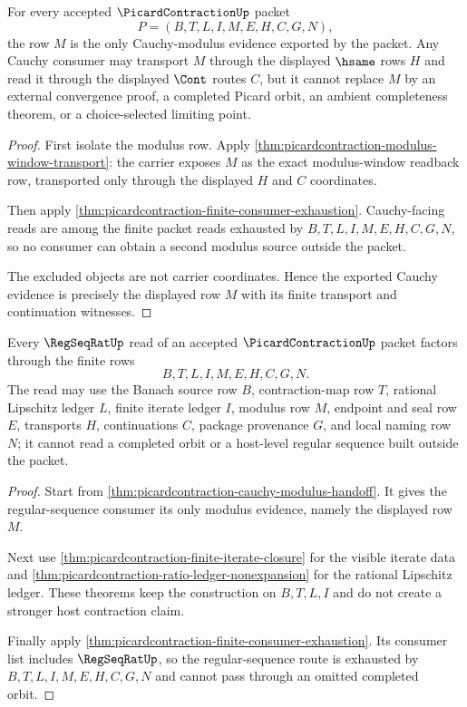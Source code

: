 \begin{theorem}
\label{thm:picardcontraction-cauchy-modulus-handoff}
For every accepted $\PicardContractionUp$ packet
$$
P=(B,T,L,I,M,E,H,C,G,N),
$$
the row $M$ is the only Cauchy-modulus evidence exported by the packet. Any Cauchy consumer may transport $M$ through the displayed $\hsame$ rows $H$ and read it through the displayed $\Cont$ routes $C$, but it cannot replace $M$ by an external convergence proof, a completed Picard orbit, an ambient completeness theorem, or a choice-selected limiting point.
\end{theorem}

\begin{proof}
First isolate the modulus row. Apply \autoref{thm:picardcontraction-modulus-window-transport}: the carrier exposes $M$ as the exact modulus-window readback row, transported only through the displayed $H$ and $C$ coordinates.

Then apply \autoref{thm:picardcontraction-finite-consumer-exhaustion}. Cauchy-facing reads are among the finite packet reads exhausted by $B,T,L,I,M,E,H,C,G,N$, so no consumer can obtain a second modulus source outside the packet.

The excluded objects are not carrier coordinates. Hence the exported Cauchy evidence is precisely the displayed row $M$ with its finite transport and continuation witnesses.
\end{proof}

\begin{theorem}
\label{thm:picardcontraction-regseqrat-consumer-route}
Every $\RegSeqRatUp$ read of an accepted $\PicardContractionUp$ packet factors through the finite rows
$$
B,T,L,I,M,E,H,C,G,N.
$$
The read may use the Banach source row $B$, contraction-map row $T$, rational Lipschitz ledger $L$, finite iterate ledger $I$, modulus row $M$, endpoint and seal row $E$, transports $H$, continuations $C$, package provenance $G$, and local naming row $N$; it cannot read a completed orbit or a host-level regular sequence built outside the packet.
\end{theorem}

\begin{proof}
Start from \autoref{thm:picardcontraction-cauchy-modulus-handoff}. It gives the regular-sequence consumer its only modulus evidence, namely the displayed row $M$.

Next use \autoref{thm:picardcontraction-finite-iterate-closure} for the visible iterate data and \autoref{thm:picardcontraction-ratio-ledger-nonexpansion} for the rational Lipschitz ledger. These theorems keep the construction on $B,T,L,I$ and do not create a stronger host contraction claim.

Finally apply \autoref{thm:picardcontraction-finite-consumer-exhaustion}. Its consumer list includes $\RegSeqRatUp$, so the regular-sequence route is exhausted by $B,T,L,I,M,E,H,C,G,N$ and cannot pass through an omitted completed orbit.
\end{proof}

